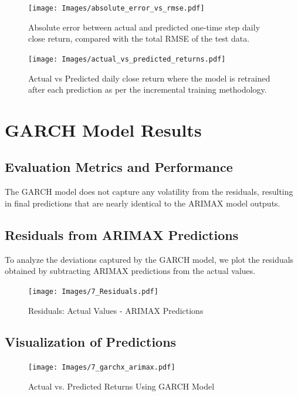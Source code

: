 \begin{figure}[h!]
    \centering
    \texttt{[image: Images/absolute\_error\_vs\_rmse.pdf]}
    \caption{Absolute error between actual and predicted one-time step daily close return, compared with the total RMSE of the test data.}
    \label{fig:absolute_error_rmse}
\end{figure}

\begin{figure}[h!]
    \centering
    \texttt{[image: Images/actual\_vs\_predicted\_returns.pdf]}
    \caption{Actual vs Predicted daily close return where the model is retrained after each prediction as per the incremental training methodology.}
    \label{fig:actual_vs_predicted}
\end{figure}

\section{GARCH Model Results}

\subsection{Evaluation Metrics and Performance}

The GARCH model does not capture any volatility from the residuals, resulting in final predictions that are nearly identical to the ARIMAX model outputs.

\subsection{Residuals from ARIMAX Predictions}

To analyze the deviations captured by the GARCH model, we plot the residuals obtained by subtracting ARIMAX predictions from the actual values.

\begin{figure}[h!]
    \centering
    \texttt{[image: Images/7\_Residuals.pdf]}
    \caption{Residuals: Actual Values - ARIMAX Predictions}
    \label{fig:residuals_actual_arimax}
\end{figure}

\subsection{Visualization of Predictions}

\begin{figure}[h!]
    \centering
    \texttt{[image: Images/7\_garchx\_arimax.pdf]}
    \caption{Actual vs. Predicted Returns Using GARCH Model}
    \label{fig:garch_actual_pred}
\end{figure}


